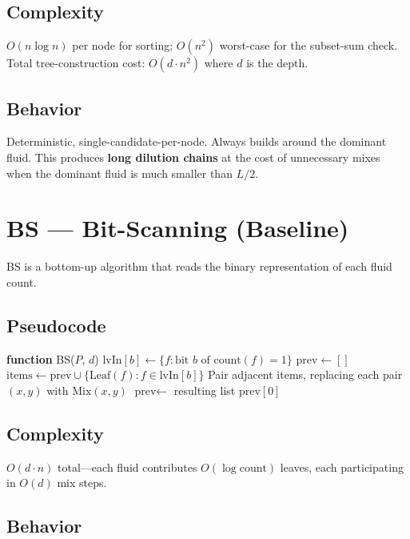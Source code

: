 \subsection{Complexity}

$O(n \log n)$ per node for sorting; $O(n^2)$ worst-case for the subset-sum check. Total tree-construction cost: $O(d \cdot n^2)$ where $d$ is the depth.

\subsection{Behavior}

Deterministic, single-candidate-per-node. Always builds around the dominant fluid. This produces \textbf{long dilution chains} at the cost of unnecessary mixes when the dominant fluid is much smaller than $L/2$.

\section{BS --- Bit-Scanning (Baseline)}
\label{sec:bs_algo}

BS is a bottom-up algorithm that reads the binary representation of each fluid count.

\subsection{Pseudocode}

\begin{algorithmic}[1]
\STATE \textbf{function} BS($P$, $d$)
    \STATE $\text{lvIn}[b] \gets \{f : \text{bit } b \text{ of count}(f) = 1\}$
\ENDFOR
\STATE $\text{prev} \gets []$
    \STATE $\text{items} \gets \text{prev} \cup \{\text{Leaf}(f) : f \in \text{lvIn}[b]\}$
    \STATE Pair adjacent items, replacing each pair $(x, y)$ with $\text{Mix}(x, y)$
    \STATE $\text{prev} \gets$ resulting list
\ENDFOR
\RETURN $\text{prev}[0]$
\end{algorithmic}

\subsection{Complexity}

$O(d \cdot n)$ total---each fluid contributes $O(\log \text{count})$ leaves, each participating in $O(d)$ mix steps.

\subsection{Behavior}

